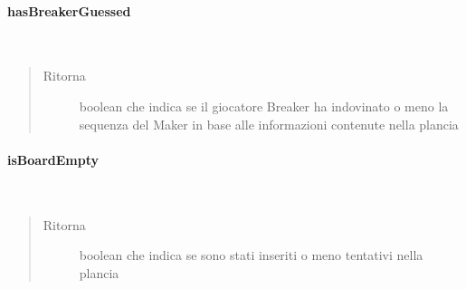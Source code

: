 \documentclass[letterpaper,10pt,italian,openany,oneside]{sphinxmanual}
\begin{document}
\paragraph{hasBreakerGuessed}
\label{\detokenize{test/it/unicam/cs/pa/mastermind/gamecore/BoardModel:hasbreakerguessed}}

\begin{fulllineitems}
\label{\detokenize{test/it/unicam/cs/pa/mastermind/gamecore/BoardModel:it.unicam.cs.pa.mastermind.gamecore.BoardModel.hasBreakerGuessed()}}~\begin{quote}\begin{description}
\item[{Ritorna}] \leavevmode
boolean che indica se il giocatore Breaker ha indovinato o meno la sequenza del Maker in base alle informazioni contenute nella plancia

\end{description}\end{quote}

\end{fulllineitems}



\paragraph{isBoardEmpty}
\label{\detokenize{test/it/unicam/cs/pa/mastermind/gamecore/BoardModel:isboardempty}}

\begin{fulllineitems}
\label{\detokenize{test/it/unicam/cs/pa/mastermind/gamecore/BoardModel:it.unicam.cs.pa.mastermind.gamecore.BoardModel.isBoardEmpty()}}~\begin{quote}\begin{description}
\item[{Ritorna}] \leavevmode
boolean che indica se sono stati inseriti o meno tentativi nella plancia

\end{description}\end{quote}

\end{fulllineitems}
\end{document}
